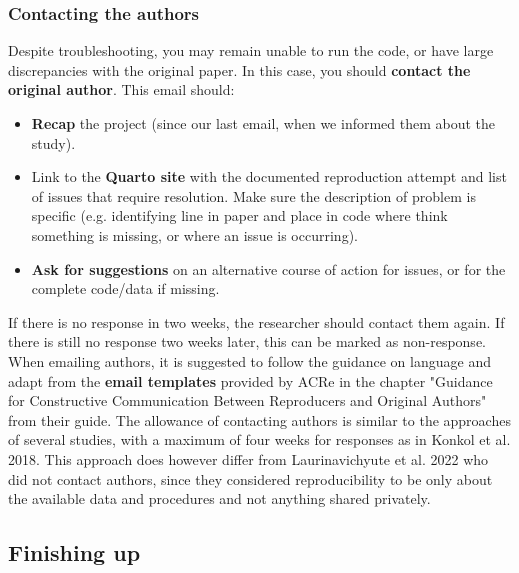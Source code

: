 \subsubsection{Contacting the authors}

Despite troubleshooting, you may remain unable to run the code, or have large discrepancies with the original paper. In this case, you should \textbf{contact the original author}. This email should:
\begin{itemize}
    \item \textbf{Recap} the project (since our last email, when we informed them about the study).
    \item Link to the \textbf{Quarto site} with the documented reproduction attempt and list of issues that require resolution. Make sure the description of problem is specific (e.g. identifying line in paper and place in code where think something is missing, or where an issue is occurring).
    \item \textbf{Ask for suggestions} on an alternative course of action for issues, or for the complete code/data if missing.
\end{itemize}

If there is no response in two weeks, the researcher should contact them again. If there is still no response two weeks later, this can be marked as non-response. When emailing authors, it is suggested to follow the guidance on language and adapt from the \textbf{email templates} provided by ACRe in the chapter "Guidance for Constructive Communication Between Reproducers and Original Authors" from their guide.\autocite{berkeley_initiative_for_transparency_in_the_social_sciences_guide_2022} The allowance of contacting authors is similar to the approaches of several studies,\autocite{krafczyk_learning_2021,wood_push_2018,berkeley_initiative_for_transparency_in_the_social_sciences_guide_2022,hardwicke_analytic_2021,konkol_computational_2019} with a maximum of four weeks for responses as in Konkol et al. 2018\autocite{konkol_computational_2019}. This approach does however differ from Laurinavichyute et al. 2022\autocite{laurinavichyute_share_2022} who did not contact authors, since they considered reproducibility to be only about the available data and procedures and not anything shared privately.\autocite{laurinavichyute_share_2022}

\vspace{0.5cm}
\subsection{Finishing up}

